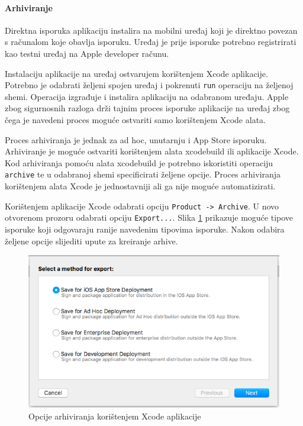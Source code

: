 \documentclass[times, utf8, diplomski, numeric]{fer}
\begin{document}
\begin{appendices}
\paragraph{Arhiviranje}

Direktna isporuka aplikaciju instalira na mobilni uređaj koji je direktno povezan s računalom koje obavlja isporuku. Uređaj je prije isporuke potrebno registrirati kao testni uređaj na Apple developer računu.

Instalaciju aplikacije na uređaj ostvarujem korištenjem Xcode aplikacije. Potrebno je odabrati željeni spojen uređaj i pokrenuti \verb|run| operaciju na željenoj shemi. Operacija izgrađuje i instalira aplikaciju na odabranom uređaju. Apple zbog sigurnosnih razloga drži tajnim proces isporuke aplikacije na uređaj zbog čega je navedeni proces moguće ostvariti samo korištenjem Xcode alata.

Proces arhiviranja je jednak za ad hoc, unutarnju i App Store isporuku. Arhiviranje je moguće ostvariti korištenjem alata xcodebuild ili aplikacije Xcode. Kod arhiviranja pomoću alata xcodebuild je potrebno iskoristiti operaciju \verb|archive| te u odabranoj shemi specificirati željene opcije. Proces arhiviranja korištenjem alata Xcode je jednostavniji ali ga nije moguće automatizirati.

Korištenjem aplikacije Xcode odabrati opciju \verb|Product -> Archive|. U novo otvorenom prozoru odabrati opciju \verb|Export...|. Slika \ref{fig:XcodeArchiveOptions} prikazuje moguće tipove isporuke koji odgovaraju ranije navedenim tipovima isporuke. Nakon odabira željene opcije slijediti upute za kreiranje arhive.

\begin{figure}
\centering
\includegraphics[scale=0.5]{XcodeArchiveOptions}
\caption{Opcije arhiviranja korištenjem Xcode aplikacije}
\label{fig:XcodeArchiveOptions}
\end{figure}


\end{appendices}
\end{document}
